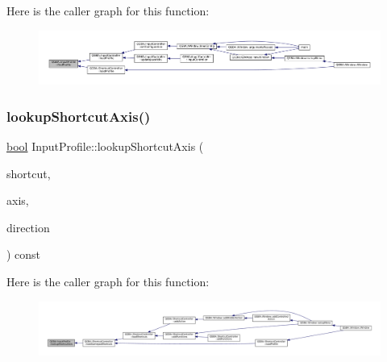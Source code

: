 Here is the caller graph for this function\+:
\nopagebreak
\begin{figure}[H]
\begin{center}
\leavevmode
\includegraphics[width=350pt]{class_q_g_b_a_1_1_input_profile_ac6eae13b93ba25478a13e3a5cac69b46_icgraph}
\end{center}
\end{figure}
\mbox{\label{class_q_g_b_a_1_1_input_profile_afd26d290f09ffc81d3f0502f8d741efa}} 
\subsubsection{\texorpdfstring{lookup\+Shortcut\+Axis()}{lookupShortcutAxis()}}
{\footnotesize\ttfamily \mbox{\hyperlink{libretro_8h_a4a26dcae73fb7e1528214a068aca317e}{bool}} Input\+Profile\+::lookup\+Shortcut\+Axis (\begin{DoxyParamCaption}\item[{const Q\+String \&}]{shortcut,  }\item[{\mbox{\hyperlink{ioapi_8h_a787fa3cf048117ba7123753c1e74fcd6}{int}} $\ast$}]{axis,  }\item[{\mbox{\hyperlink{class_q_g_b_a_1_1_gamepad_axis_event_a5d50ab74dce4e58252f2affb5f227bbc}{Gamepad\+Axis\+Event\+::\+Direction}} $\ast$}]{direction }\end{DoxyParamCaption}) const}

Here is the caller graph for this function\+:
\nopagebreak
\begin{figure}[H]
\begin{center}
\leavevmode
\includegraphics[width=350pt]{class_q_g_b_a_1_1_input_profile_afd26d290f09ffc81d3f0502f8d741efa_icgraph}
\end{center}
\end{figure}
\mbox{\label{class_q_g_b_a_1_1_input_profile_aa1db0602f8f404d2f5a6d0ae29445326}} 
